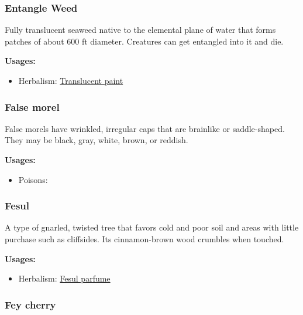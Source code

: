 \subsubsection{Entangle Weed}
\label{Entangle Weed}

Fully translucent seaweed native to the elemental plane of water that forms patches of about 600 ft diameter. Creatures can get entangled into it and die.

\vspace{5mm}

\textbf{Usages:}

\begin{itemize}[noitemsep]
\item[] Herbalism: \hyperref[Translucent paint]{Translucent paint}
\end{itemize}

\subsubsection{False morel}
\label{False morel}

False morels have wrinkled, irregular caps that are brainlike or saddle-shaped. They may be black, gray, white, brown, or reddish.

\vspace{5mm}

\textbf{Usages:}

\begin{itemize}[noitemsep]
\item[] Poisons: \poison
\end{itemize}


\subsubsection{Fesul}
\label{Fesul}

A type of gnarled, twisted tree that favors cold and poor soil and areas with little purchase such as cliffsides. Its cinnamon-brown wood crumbles when touched.

\vspace{5mm}

\textbf{Usages:}

\begin{itemize}[noitemsep]
\item[] Herbalism: \hyperref[Fesul parfume]{Fesul parfume}
\end{itemize}

\subsubsection{Fey cherry}
\label{Fey cherry}

